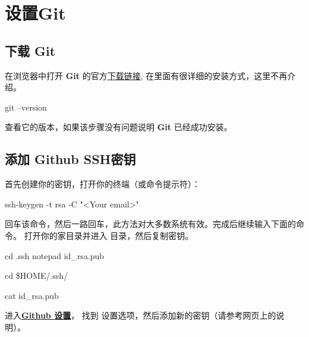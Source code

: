 \documentclass{report}
\begin{document}
\title{\fontsize{56pt}}
\author{\fontsize{48pt}}
\date{\today}

\maketitle

\newpage
\section*{设置Git}

\subsection*{下载 Git}

在浏览器中打开 \textbf{Git} 的官方\href{https://git-scm.com/downloads}{下载链接},
在里面有很详细的安装方式，这里不再介绍。

\begin{tcolorbox}
git --version
\end{tcolorbox}

查看它的版本，如果该步骤没有问题说明 \textbf{Git} 已经成功安装。

\subsection*{添加 Github SSH密钥}

首先创建你的密钥，打开你的终端（或命令提示符）：
\begin{tcolorbox}
ssh-keygen -t rsa -C "<Your email>"
\end{tcolorbox}


回车该命令，然后一路回车，此方法对大多数系统有效。完成后继续输入下面的命令。
打开你的家目录并进入  目录，然后复制密钥。

\begin{tcolorbox}[title = {\textbf{Windows}}]
cd .ssh\texttt{}
notepad id\_rsa.pub
\end{tcolorbox}

\begin{tcolorbox}[title = {\textbf{Linux or MacOS}}]
cd \$HOME/.ssh/ \par
cat id\_rsa.pub
\end{tcolorbox}

进入\textbf{\href{https://github.com/settings/}{Github 设置}}，
找到  设置选项，然后添加新的密钥（请参考网页上的说明）。
\end{document}
